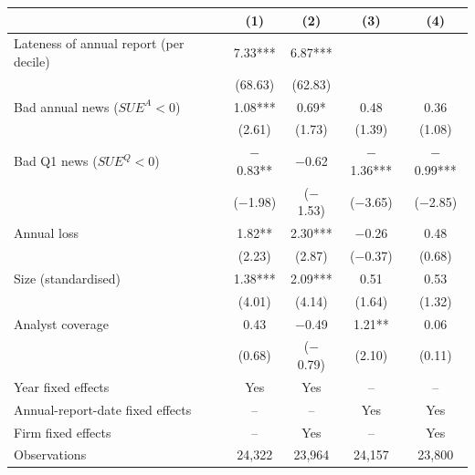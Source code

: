 \begin{tabular}{lcccc}
\toprule
 & (1) & (2) & (3) & (4)\\
\midrule
Lateness of annual report (per decile) & 7.33*** & 6.87*** &  & \\
 & (68.63) & (62.83) &  & \\[1pt]
Bad annual news ($SUE^{A}<0$) & 1.08*** & 0.69* & 0.48 & 0.36\\
 & (2.61) & (1.73) & (1.39) & (1.08)\\[1pt]
Bad Q1 news ($SUE^{Q}<0$) & \ensuremath{-}0.83** & \ensuremath{-}0.62 & \ensuremath{-}1.36*** & \ensuremath{-}0.99***\\
 & (\ensuremath{-}1.98) & (\ensuremath{-}1.53) & (\ensuremath{-}3.65) & (\ensuremath{-}2.85)\\[1pt]
Annual loss & 1.82** & 2.30*** & \ensuremath{-}0.26 & 0.48\\
 & (2.23) & (2.87) & (\ensuremath{-}0.37) & (0.68)\\[1pt]
Size (standardised) & 1.38*** & 2.09*** & 0.51 & 0.53\\
 & (4.01) & (4.14) & (1.64) & (1.32)\\[1pt]
Analyst coverage & 0.43 & \ensuremath{-}0.49 & 1.21** & 0.06\\
 & (0.68) & (\ensuremath{-}0.79) & (2.10) & (0.11)\\[1pt]
\midrule
Year fixed effects & Yes & Yes & -- & --\\
Annual-report-date fixed effects & -- & -- & Yes & Yes\\
Firm fixed effects & -- & Yes & -- & Yes\\
Observations & 24,322 & 23,964 & 24,157 & 23,800\\
\bottomrule
\end{tabular}
